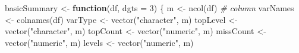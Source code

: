 \documentclass[
]{article}
\newenvironment{Shaded}{\begin{snugshade}}{\end{snugshade}}
\newcommand{\AttributeTok}[1]{\textcolor[rgb]{0.77,0.63,0.00}{#1}}
\newcommand{\CommentTok}[1]{\textcolor[rgb]{0.56,0.35,0.01}{\textit{#1}}}
\newcommand{\ControlFlowTok}[1]{\textcolor[rgb]{0.13,0.29,0.53}{\textbf{#1}}}
\newcommand{\DecValTok}[1]{\textcolor[rgb]{0.00,0.00,0.81}{#1}}
\newcommand{\FunctionTok}[1]{\textcolor[rgb]{0.00,0.00,0.00}{#1}}
\newcommand{\NormalTok}[1]{#1}
\newcommand{\OtherTok}[1]{\textcolor[rgb]{0.56,0.35,0.01}{#1}}
\newcommand{\StringTok}[1]{\textcolor[rgb]{0.31,0.60,0.02}{#1}}
\begin{document}
\begin{Shaded}
\begin{Highlighting}[]
\NormalTok{basicSummary }\OtherTok{\textless{}{-}} \ControlFlowTok{function}\NormalTok{(df, }\AttributeTok{dgts =} \DecValTok{3}\NormalTok{) \{}
\NormalTok{  m }\OtherTok{\textless{}{-}} \FunctionTok{ncol}\NormalTok{(df) }\CommentTok{\# column}
\NormalTok{  varNames }\OtherTok{\textless{}{-}} \FunctionTok{colnames}\NormalTok{(df)}
\NormalTok{  varType }\OtherTok{\textless{}{-}} \FunctionTok{vector}\NormalTok{(}\StringTok{"character"}\NormalTok{, m)}
\NormalTok{  topLevel }\OtherTok{\textless{}{-}} \FunctionTok{vector}\NormalTok{(}\StringTok{"character"}\NormalTok{, m)}
\NormalTok{  topCount }\OtherTok{\textless{}{-}} \FunctionTok{vector}\NormalTok{(}\StringTok{"numeric"}\NormalTok{, m)}
\NormalTok{  missCount }\OtherTok{\textless{}{-}} \FunctionTok{vector}\NormalTok{(}\StringTok{"numeric"}\NormalTok{, m)}
\NormalTok{  levels }\OtherTok{\textless{}{-}} \FunctionTok{vector}\NormalTok{(}\StringTok{"numeric"}\NormalTok{, m)}
  

\end{Highlighting}
\end{Shaded}
\end{document}
